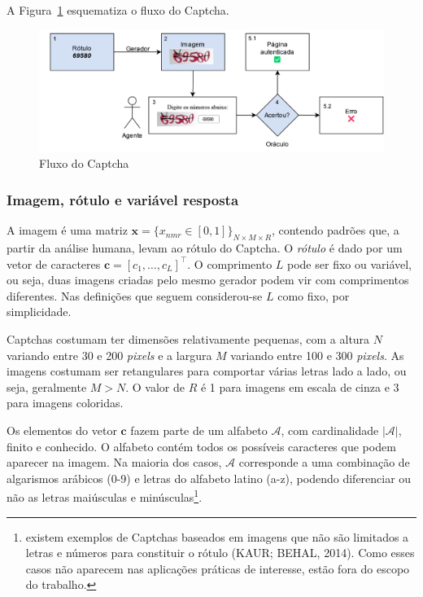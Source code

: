 \documentclass[12pt,twoside,brazilian]{book}
\begin{document}
A Figura~\ref{fig-esquema-captcha} esquematiza o fluxo do Captcha.

\begin{figure}

{\centering \includegraphics{./assets/img/esquema-captcha.png}

}

\caption{\label{fig-esquema-captcha}Fluxo do Captcha}

\end{figure}

\hypertarget{imagem-ruxf3tulo-e-variuxe1vel-resposta}{%
\subsubsection{Imagem, rótulo e variável
resposta}\label{imagem-ruxf3tulo-e-variuxe1vel-resposta}}

A imagem é uma matriz
\(\mathbf x = \{x_{nmr} \in [0,1]\}_{N\times M \times R}\), contendo
padrões que, a partir da análise humana, levam ao rótulo do Captcha. O
\emph{rótulo} é dado por um vetor de caracteres
\(\mathbf c = [c_1,\dots,c_L]^\top\). O comprimento \(L\) pode ser fixo
ou variável, ou seja, duas imagens criadas pelo mesmo gerador podem vir
com comprimentos diferentes. Nas definições que seguem considerou-se
\(L\) como fixo, por simplicidade.

Captchas costumam ter dimensões relativamente pequenas, com a altura
\(N\) variando entre 30 e 200 \emph{pixels} e a largura \(M\) variando
entre 100 e 300 \emph{pixels}. As imagens costumam ser retangulares para
comportar várias letras lado a lado, ou seja, geralmente \(M > N\). O
valor de \(R\) é 1 para imagens em escala de cinza e 3 para imagens
coloridas.

Os elementos do vetor \(\mathbf c\) fazem parte de um alfabeto
\(\mathcal A\), com cardinalidade \(|\mathcal A|\), finito e conhecido.
O alfabeto contém todos os possíveis caracteres que podem aparecer na
imagem. Na maioria dos casos, \(\mathcal A\) corresponde a uma
combinação de algarismos arábicos (0-9) e letras do alfabeto latino
(a-z), podendo diferenciar ou não as letras maiúsculas e
minúsculas\footnote{existem exemplos de Captchas baseados em imagens que
  não são limitados a letras e números para constituir o rótulo (KAUR;
  BEHAL, 2014). Como esses casos não aparecem nas aplicações práticas de
  interesse, estão fora do escopo do trabalho.}.
\end{document}
